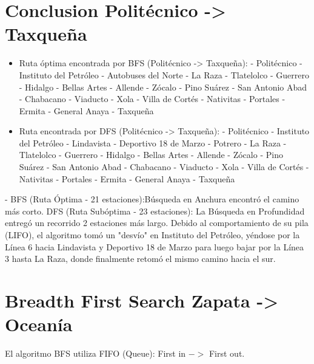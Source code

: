 \documentclass[10pt,a4paper]{article}
\begin{document}
\newpage
\section{Conclusion Politécnico -> Taxqueña}

\begin{itemize}
    \item Ruta óptima encontrada por BFS (Politécnico -> Taxqueña):
- Politécnico
- Instituto del Petróleo
- Autobuses del Norte
- La Raza
- Tlatelolco
- Guerrero
- Hidalgo
- Bellas Artes
- Allende
- Zócalo
- Pino Suárez
- San Antonio Abad
- Chabacano
- Viaducto
- Xola
- Villa de Cortés
- Nativitas
- Portales
- Ermita
- General Anaya
- Taxqueña

\item Ruta encontrada por DFS (Politécnico -> Taxqueña):
- Politécnico
- Instituto del Petróleo
- Lindavista
- Deportivo 18 de Marzo
- Potrero
- La Raza
- Tlatelolco
- Guerrero
- Hidalgo
- Bellas Artes
- Allende
- Zócalo
- Pino Suárez
- San Antonio Abad
- Chabacano
- Viaducto
- Xola
- Villa de Cortés
- Nativitas
- Portales
- Ermita
- General Anaya
- Taxqueña
\end{itemize}


\begin{alerta}{-}
   BFS (Ruta Óptima - 21 estaciones):Búsqueda en Anchura encontró el camino más corto.
   DFS (Ruta Subóptima - 23 estaciones): La Búsqueda en Profundidad entregó un recorrido 2 estaciones más largo. Debido al comportamiento de su pila (LIFO), 
   el algoritmo tomó un "desvío" en Instituto del Petróleo, 
   yéndose por la Línea 6 hacia Lindavista y Deportivo 18 de Marzo para 
   luego bajar por la Línea 3 hasta La Raza, donde finalmente retomó el mismo camino hacia el sur.
\end{alerta}


\newpage



\section{Breadth First Search Zapata -> Oceanía}

\vspace{3mm}

El algoritmo BFS utiliza FIFO (Queue): First in \(->\) First out.
\end{document}
